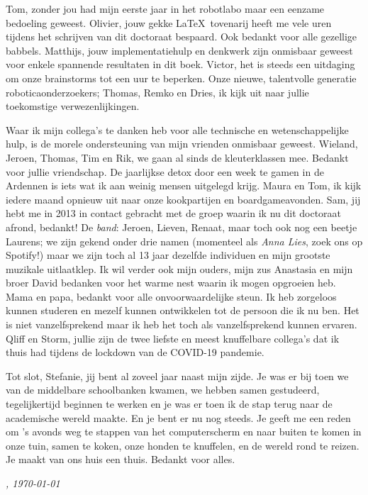\documentclass[\home/main.tex]{subfiles}
\begin{document}
Tom, zonder jou had mijn eerste jaar in het robotlabo maar een eenzame bedoeling geweest. Olivier, jouw gekke \LaTeX\ tovenarij heeft me vele uren tijdens het schrijven van dit doctoraat bespaard. Ook bedankt voor alle gezellige babbels.
Matthijs, jouw implementatiehulp en denkwerk zijn onmisbaar geweest voor enkele spannende resultaten in dit boek.
Victor, het is steeds een uitdaging om onze brainstorms tot een uur te beperken.
Onze nieuwe, talentvolle generatie roboticaonderzoekers; Thomas, Remko en Dries, ik kijk uit naar jullie toekomstige verwezenlijkingen.

Waar ik mijn collega's te danken heb voor alle technische en wetenschappelijke hulp, is de morele ondersteuning van mijn vrienden onmisbaar geweest.
Wieland, Jeroen, Thomas, Tim en Rik, we gaan al sinds de kleuterklassen mee. Bedankt voor jullie vriendschap. De jaarlijkse detox door een week te gamen in de Ardennen is iets wat ik aan weinig mensen uitgelegd krijg.
Maura en Tom, ik kijk iedere maand opnieuw uit naar onze kookpartijen en boardgameavonden.
Sam, jij hebt me in 2013 in contact gebracht met de groep waarin ik nu dit doctoraat afrond, bedankt!
De \textit{band}: Jeroen, Lieven, Renaat, maar toch ook nog een beetje Laurens; we zijn gekend onder drie namen (momenteel als \textit{Anna Lies}, zoek ons op Spotify!) maar we zijn toch al 13 jaar dezelfde individuen en mijn grootste muzikale uitlaatklep.
Ik wil verder ook mijn ouders, mijn zus Anastasia en mijn broer David bedanken voor het warme nest waarin ik mogen opgroeien heb. 
Mama en papa, bedankt voor alle onvoorwaardelijke steun. Ik heb zorgeloos kunnen studeren en mezelf kunnen ontwikkelen tot de persoon die ik nu ben. Het is niet vanzelfsprekend maar ik heb het toch als vanzelfsprekend kunnen ervaren.
Qliff en Storm, jullie zijn de twee liefste en meest knuffelbare collega's dat ik thuis had tijdens de lockdown van de COVID-19 pandemie.

Tot slot, Stefanie, jij bent al zoveel jaar naast mijn zijde. Je was er bij toen we van de middelbare schoolbanken kwamen, we hebben samen gestudeerd, tegelijkertijd beginnen te werken en je was er toen ik de stap terug naar de academische wereld maakte. En je bent er nu nog steeds. 
Je geeft me een reden om 's avonds weg te stappen van het computerscherm en naar buiten te komen in onze tuin, samen te koken, onze honden te knuffelen, en de wereld rond te reizen. Je maakt van ons huis een thuis. Bedankt voor alles. 

\vspace{1cm}

\begin{flushright}
    \textit{\theauthor, \today}
\end{flushright}
\end{document}
